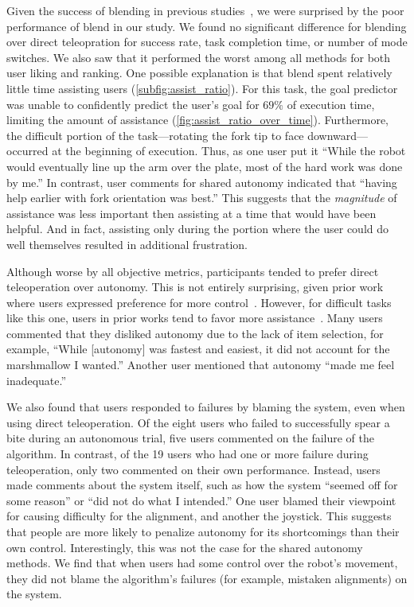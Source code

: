 Given the success of blending in previous studies~\citep{li_2011, carlson_2012, dragan_2013_assistive, muelling_2015, gopinath_2016}, we were surprised by the poor performance of blend in our study. We found no significant difference for blending over direct teleopration for success rate, task completion time, or number of mode switches. We also saw that it performed the worst among all methods for both user liking and ranking. 
One possible explanation is that blend spent relatively little time assisting users (\cref{subfig:assist_ratio}). For this task, the goal predictor was unable to confidently predict the user's goal for $69\%$ of execution time, limiting the amount of assistance (\cref{fig:assist_ratio_over_time}). Furthermore, the difficult portion of the task---rotating the fork tip to face downward---occurred at the beginning of execution. Thus, as one user put it ``While the robot would eventually line up the arm over the plate, most of the hard work was done by me.'' In contrast, user comments for shared autonomy indicated that ``having help earlier with fork orientation was best.'' 
This suggests that the \emph{magnitude} of assistance was less important then assisting at a time that would have been helpful. And in fact, assisting only during the portion where the user could do well themselves resulted in additional frustration.

Although worse by all objective metrics, participants tended to prefer direct teleoperation over autonomy. This is not entirely surprising, given prior work where users expressed preference for more control~\cite{kim_2012}. However, for difficult tasks like this one, users in prior works tend to favor more assistance~\citep{you_2011, dragan_2013_assistive}. Many users commented that they disliked autonomy due to the lack of item selection, for example, ``While [autonomy] was fastest and easiest, it did not account for the marshmallow I wanted.'' Another user mentioned that autonomy ``made me feel inadequate.''


We also found that users responded to failures by blaming the system, even when using direct teleoperation. Of the eight users who failed to successfully spear a bite during an autonomous trial, five users commented on the failure of the algorithm. In contrast, of the 19 users who had one or more failure during teleoperation, only two commented on their own performance. Instead, users made comments about the system itself, such as how the system ``seemed off for some reason'' or ``did not do what I intended.'' One user blamed their viewpoint for causing difficulty for the alignment, and another the joystick. This suggests that people are more likely to penalize autonomy for its shortcomings than their own control. Interestingly, this was not the case for the shared autonomy methods. We find that when users had some control over the robot's movement, they did not blame the algorithm's failures (for example, mistaken alignments) on the system.



